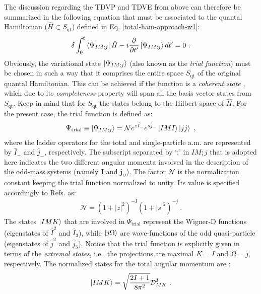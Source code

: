 The discussion regarding the TDVP and TDVE from above can therefore be summarized in the following equation that must be associated to the quantal Hamiltonian ($\hat{H}\subset S_\text{qt}$) defined in Eq. \ref{total-ham-approach-w1}:
\begin{align}
    \delta\int_0^t\bra{\Psi_{IM;j}}\hat{H}-i\frac{\partial}{\partial t'}\ket{\Psi_{IM;j}}dt'=0\ .
    \label{tdve-approach-w1}
\end{align}
Obviously, the variational state $\ket{\Psi_{IM;j}}$ (also known as the \emph{trial function}) must be chosen in such a way that it comprises the entire space $S_\text{qt}$ of the original quantal Hamiltonian. This can be achieved if the function is a \emph{coherent state} \cite{glauber1963coherent}, which due to its \emph{completeness} property will span all the basis vector states from $S_\text{qt}$. Keep in mind that for $S_\text{qt}$ the states belong to the Hilbert space of $\hat{H}$. For the present case, the trial function is defined as:
\begin{align}
    \Psi_\text{trial}\equiv\ket{\Psi_{IM;j}}=\mathcal{N}e^{z\hat{I}_-}e^{s\hat{j}_-}\ket{IMI}\ket{jj}\ ,
    \label{trial-function-appeoach-w1}
\end{align}
where the ladder operators for the total and single-particle a.m. are represented by $\hat{I}_-$ and $\hat{j}_-$, respectively. The subscript separated by `;' in $IM;j$ that is adopted here indicates the two different angular momenta involved in the description of the odd-mass systems (namely $\mathbf{I}$ and $\mathbf{j}_\mathcal{Q}$). The factor $\mathcal{N}$ is the normalization constant keeping the trial function normalized to unity. Its value is specified accordingly to Refs. \cite{raduta2007semiclassical,raduta2020new} as:
\begin{align}
    \mathcal{N}=\left(1+|z|^2\right)^{-I}\left(1+|s|^2\right)^{-j}\ .
\end{align}
The states $\ket{IMK}$ that are involved in $\Psi_\text{trial}$ represent the Wigner-D functions (eigenstates of $\hat{I}^2$ and $\hat{I}_3$), while $\ket{j\Omega}$ are wave-functions of the odd quasi-particle (eigenstates of $\hat{j}^2$ and $\hat{j}_3$). Notice that the trial function is explicitly given in terms of the \emph{extremal states}, i.e., the projections are maximal $K=I$ and $\Omega=j$, respectively. The normalized states for the total angular momentum are \cite{ring2004nuclear}:
\begin{align}
    \ket{IMK}=\sqrt{\frac{2I+1}{8\pi^2}}\mathcal{D}_{MK}^I\ .
    \label{IMK-wigner-functions}
\end{align}

